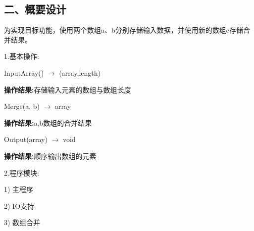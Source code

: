 \documentclass[UTF8, a4paper]{ctexart}
\begin{document}
\subsection*{二、概要设计}
为实现目标功能，使用两个数组a、b分别存储输入数据，并使用新的数组c存储合并结果。 \par
1.\;基本操作: \par
	InputArray() $\rightarrow$ (array,length) \par
	\qquad\textbf{操作结果:}\;存储输入元素的数组与数组长度 \par
	Merge(a, b) $\rightarrow$ array \par
	\qquad\textbf{操作结果:}\;a,b数组的合并结果 \par
	Output(array) $\rightarrow$ void \par
	\qquad\textbf{操作结果:}\;顺序输出数组的元素 \par
2.\;程序模块: \par
1) 主程序 \par
2) IO支持 \par
3) 数组合并 \par
\end{document}
